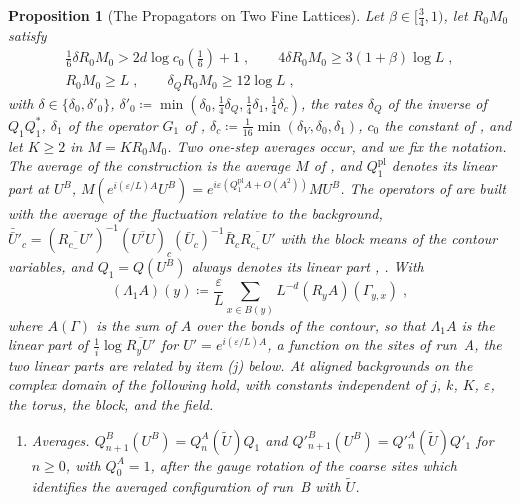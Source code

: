 \documentclass[11pt]{preprint}
\numberwithin{equation}{section}
\newtheorem{proposition}{Proposition}
\theoremstyle{definition}
\theoremstyle{remark}
\theoremstyle{plain}
\begin{document}
\begin{proposition}[The Propagators on Two Fine Lattices]\label{prop:two-lattices}
Let $\beta \in [\frac34, 1)$, let $R_0M_0$ satisfy
\begin{equation}\label{eq:shell-conditions}
    \begin{gathered}
        \tfrac16\delta R_0M_0 > 2d\log c_0(\tfrac16) + 1\;,
        \qquad
        4\delta R_0M_0 \geq 3(1 + \beta)\log L\;,
        \\
        R_0M_0 \geq L\;,
        \qquad
        \delta_QR_0M_0 \geq 12\log L\;,
    \end{gathered}
\end{equation}
with $\delta \in \{\delta_0, \delta'_0\}$, $\delta'_0 \coloneqq \min(\delta_0, \frac14\delta_Q, \frac14\delta_1, \frac14\delta_c)$, the rates $\delta_Q$ of the inverse of $Q_1Q_1^*$, $\delta_1$ of the operator $G_1$ of \cite[(3.128)]{BalabanPBG}, $\delta_c \coloneqq \frac{1}{16}\min(\delta_V, \delta_0, \delta_1)$, $c_0$ the constant of \cite[(2.58)]{BalabanPRT2}, and let $K \geq 2$ in $M = KR_0M_0$. Two one-step averages occur, and we fix the notation. The average of the construction is the average $M$ of \cite[(0.4), p.~253]{BalabanRG1}, and $Q^{\mathrm{pl}}_1$ denotes its linear part at $U^B$, $M(e^{i(\varepsilon/L)A}U^B) = e^{i\varepsilon(Q^{\mathrm{pl}}_1A + O(A^2))}MU^B$. The operators of \cite{BalabanPBG} are built with the average of the fluctuation relative to the background, $\bar{\bar U}'_c = (\overline{R_{c_-}U'})^{-1}(\overline{U'U})_c(\bar U_c)^{-1}\bar R_c\overline{R_{c_+}U'}$ with the block means \cite[(3.113), p.~418]{BalabanPBG} of the contour variables, and $Q_1 = Q(U^B)$ always denotes its linear part \cite[(3.13), p.~392]{BalabanPBG}, \cite[(121)--(124), p.~36]{BalabanAVG}. With
\begin{equation}\label{eq:block-gauge-parameter}
    (\Lambda_1A)(y) \coloneqq \frac\varepsilon L\sum_{x \in B(y)}L^{-d}(R_yA)(\Gamma_{y,x})\;,
\end{equation}
where $A(\Gamma)$ is the sum of $A$ over the bonds of the contour, so that $\Lambda_1A$ is the linear part of $\frac1i\log\overline{R_yU'}$ for $U' = e^{i(\varepsilon/L)A}$, a function on the sites of run~A, the two linear parts are related by item (j) below. At aligned backgrounds on the complex domain of \cite[(3.37), p.~396]{BalabanPBG} the following hold, with constants independent of $j$, $k$, $K$, $\varepsilon$, the torus, the block, and the field.
\begin{enumerate}[label=(\alph*)]
\item \emph{Averages.} $Q^B_{n+1}(U^B) = Q^A_n(\tilde U)Q_1$ and $Q'^B_{n+1}(U^B) = Q'^A_n(\tilde U)Q'_1$ for $n \geq 0$, with $Q^A_0 = 1$, after the gauge rotation of the coarse sites which identifies the averaged configuration of run~B with $\tilde U$.

\end{enumerate}
\end{proposition}
\end{document}
